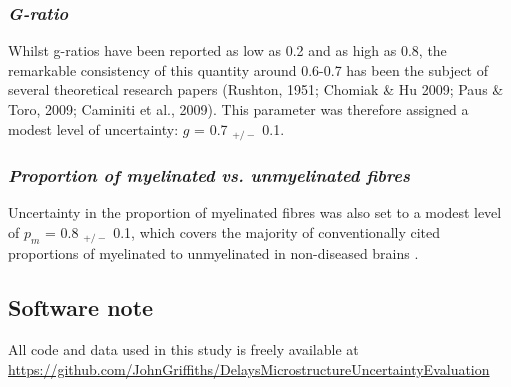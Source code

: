 \subsubsection*{\textit{G-ratio}}

Whilst g-ratios have been reported as low as 0.2 and as high as 0.8, the
remarkable consistency of this quantity around 0.6-0.7 has been the
subject of several theoretical research papers (Rushton, 1951; Chomiak
\& Hu 2009; Paus \& Toro, 2009; Caminiti et al., 2009). This parameter
was therefore assigned a modest level of uncertainty: $g$ = 0.7 $_{+/-}$
0.1. 

\subsubsection*{\textit{Proportion of myelinated vs. unmyelinated fibres}}

Uncertainty in the proportion of myelinated fibres was
also set to a modest level of $p_{m}$ = 0.8 $_{+/-}$ 0.1, which covers
the majority of conventionally cited proportions of myelinated to
unmyelinated in non-diseased brains  .

 
\subsection{Software note}

All code and data used in this study is freely available at \url{https://github.com/JohnGriffiths/DelaysMicrostructureUncertaintyEvaluation}

